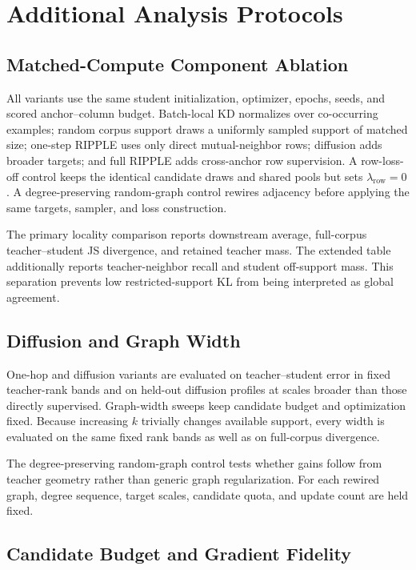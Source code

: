 \section{Additional Analysis Protocols}
\label{app:additional-analysis}

\subsection{Matched-Compute Component Ablation}
\label{app:ablation-protocol}

All variants use the same student initialization, optimizer, epochs, seeds, and scored anchor--column budget. Batch-local KD normalizes over co-occurring examples; random corpus support draws a uniformly sampled support of matched size; one-step RIPPLE uses only direct mutual-neighbor rows; diffusion adds broader targets; and full RIPPLE adds cross-anchor row supervision. A row-loss-off control keeps the identical candidate draws and shared pools but sets $\lambda_{\mathrm{row}}=0$. A degree-preserving random-graph control rewires adjacency before applying the same targets, sampler, and loss construction.

The primary locality comparison reports downstream average, full-corpus teacher--student JS divergence, and retained teacher mass. The extended table additionally reports teacher-neighbor recall and student off-support mass. This separation prevents low restricted-support KL from being interpreted as global agreement.

\subsection{Diffusion and Graph Width}

One-hop and diffusion variants are evaluated on teacher--student error in fixed teacher-rank bands and on held-out diffusion profiles at scales broader than those directly supervised. Graph-width sweeps keep candidate budget and optimization fixed. Because increasing $k$ trivially changes available support, every width is evaluated on the same fixed rank bands as well as on full-corpus divergence.

The degree-preserving random-graph control tests whether gains follow from teacher geometry rather than generic graph regularization. For each rewired graph, degree sequence, target scales, candidate quota, and update count are held fixed.

\subsection{Candidate Budget and Gradient Fidelity}

